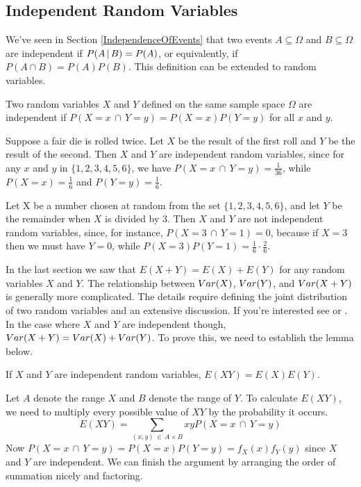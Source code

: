 \subsection*{Independent Random Variables}

We've seen in Section \ref{IndependenceOfEvents} that two events $A \subseteq \Omega$ and $B \subseteq \Omega$ are independent if $P(A \,|\, B) = P(A)$, or equivalently, if $P(A \cap B) = P(A)P(B)$. This definition can be extended to random variables.

\begin{defn}\label{IndependenceOfRVs}
Two random variables $X$ and $Y$ defined on the same sample space $\Omega$ are independent if $P(X = x \,\cap\, Y = y) = P(X = x)P(Y = y)$ for all $x$ and $y$.\end{defn}

\begin{examp}Suppose a fair die is rolled twice. Let $X$ be the result of the first roll and $Y$ be the result of the second. Then $X$ and $Y$ are independent random variables, since for any $x$ and $y$ in $\{1,2,3,4,5,6\}$, we have $P(X = x \,\cap\, Y = y) = \frac{1}{36}$, while $P(X = x) = \frac{1}{6}$ and $P(Y=y) = \frac{1}{6}$.
\end{examp}

\begin{examp}Let X be a number chosen at random from the set $\{1,2,3,4,5,6\}$, and let $Y$ be the remainder when $X$ is divided by 3. Then $X$ and $Y$ are not independent random variables, since, for instance, $P(X = 3 \,\cap\, Y = 1) = 0$, because if $X = 3$ then we must have $Y = 0$, while $P(X = 3)P(Y = 1) = \frac{1}{6}\cdot\frac{2}{6}$.
\end{examp}

In the last section we saw that $E(X+Y) = E(X) + E(Y)$ for any random variables $X$ and $Y$. The relationship between $Var(X)$, $Var(Y)$, and $Var(X+Y)$ is generally more complicated. The details require defining the joint distribution of two random variables and an extensive discussion. If you're interested see \cite{Bertsekas} or \cite{Ghahramani}. In the case where $X$ and $Y$ are independent though, $Var(X+Y) = Var(X) + Var(Y)$. To prove this, we need to establish the lemma below.

\begin{lem}\label{ExpectationIndependentProduct} If $X$ and $Y$ are independent random variables, $E(XY) = E(X)E(Y)$.
\end{lem}
\begin{pf} Let $A$ denote the range $X$ and $B$ denote the range of $Y$. To calculate $E(XY)$, we need to multiply every possible value of $XY$ by the probability it occurs.
$$E(XY) = \sum_{(x, y) \,\in\, A \times B} xy P(X = x \,\cap\, Y= y)$$
\noindent Now $P(X = x \,\cap\, Y= y) = P(X = x)P(Y=y) = f_X(x)f_Y(y)$ since $X$ and $Y$ are independent. We can finish the argument by arranging the order of summation nicely and factoring. 
\end{pf}

